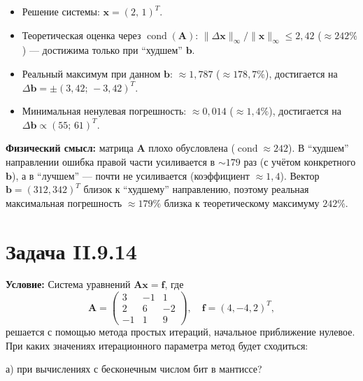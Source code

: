 \documentclass{article}
\begin{document}
\begin{itemize}
    \item Решение системы: $\mathbf{x} = (2,\, 1)^T$.
    \item Теоретическая оценка через $\operatorname{cond}(\mathbf{A})$: $\|\Delta\mathbf{x}\|_\infty/\|\mathbf{x}\|_\infty \leqslant 2{,}42$ ($\approx 242\%$) --- достижима только при ``худшем'' $\mathbf{b}$.
    \item Реальный максимум при данном $\mathbf{b}$: $\approx 1{,}787$ ($\approx 178{,}7\%$), достигается на $\Delta\mathbf{b} = \pm(3{,}42;\, -3{,}42)^T$.
    \item Минимальная ненулевая погрешность: $\approx 0{,}014$ ($\approx 1{,}4\%$), достигается на $\Delta\mathbf{b} \propto (55;\, 61)^T$.
\end{itemize}

\textbf{Физический смысл:} матрица $\mathbf{A}$ плохо обусловлена ($\operatorname{cond} \approx 242$). В ``худшем'' направлении ошибка правой части усиливается в $\sim 179$ раз (с учётом конкретного $\mathbf{b}$), а в ``лучшем'' --- почти не усиливается (коэффициент $\approx 1{,}4$). Вектор $\mathbf{b} = (312, 342)^T$ близок к ``худшему'' направлению, поэтому реальная максимальная погрешность $\approx 179\%$ близка к теоретическому максимуму $242\%$.





















\section*{Задача II.9.14}

\textbf{Условие:} Система уравнений $\mathbf{A}\mathbf{x} = \mathbf{f}$, где
$$\mathbf{A} = \begin{pmatrix} 3 & -1 & 1 \\ 2 & 6 & -2 \\ -1 & 1 & 9 \end{pmatrix}, \quad \mathbf{f} = (4, -4, 2)^T,$$
решается с помощью метода простых итераций, начальное приближение нулевое. При каких значениях итерационного параметра метод будет сходиться:

а) при вычислениях с бесконечным числом бит в мантиссе?
\end{document}
